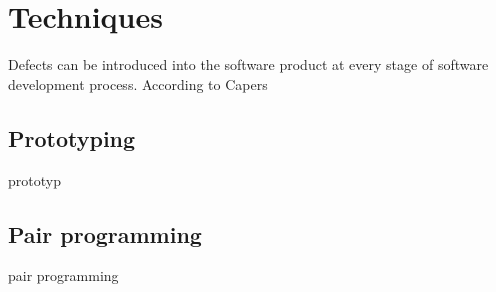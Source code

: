 \section{Techniques}
Defects can be introduced into the software product at every stage of software development process. According to Capers\cite{capers} 
\subsection{Prototyping}
prototyp
\subsection{Pair programming}
pair programming
